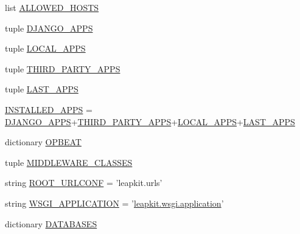 \begin{DoxyCompactItemize}
\item 
list \hyperlink{namespaceleapkit_1_1settings_1_1base__settings_a8035a4c5be4c179f87f9b9f4ac55f0fc}{A\-L\-L\-O\-W\-E\-D\-\_\-\-H\-O\-S\-T\-S}
\item 
tuple \hyperlink{namespaceleapkit_1_1settings_1_1base__settings_a288074ff9c19d256b4ff07e29312cd03}{D\-J\-A\-N\-G\-O\-\_\-\-A\-P\-P\-S}
\item 
tuple \hyperlink{namespaceleapkit_1_1settings_1_1base__settings_a8431da89ba79a3d72efb53593b286738}{L\-O\-C\-A\-L\-\_\-\-A\-P\-P\-S}
\item 
tuple \hyperlink{namespaceleapkit_1_1settings_1_1base__settings_add1b025eed8aa5becfc6a18a0531c7d2}{T\-H\-I\-R\-D\-\_\-\-P\-A\-R\-T\-Y\-\_\-\-A\-P\-P\-S}
\item 
tuple \hyperlink{namespaceleapkit_1_1settings_1_1base__settings_a022062730e649e76b1d2ed9ed44f84a4}{L\-A\-S\-T\-\_\-\-A\-P\-P\-S}
\item 
\hyperlink{namespaceleapkit_1_1settings_1_1base__settings_aed4b9c161ffdcb7cbc206a2aac095609}{I\-N\-S\-T\-A\-L\-L\-E\-D\-\_\-\-A\-P\-P\-S} = \hyperlink{namespaceleapkit_1_1settings_1_1base__settings_a288074ff9c19d256b4ff07e29312cd03}{D\-J\-A\-N\-G\-O\-\_\-\-A\-P\-P\-S}+\hyperlink{namespaceleapkit_1_1settings_1_1base__settings_add1b025eed8aa5becfc6a18a0531c7d2}{T\-H\-I\-R\-D\-\_\-\-P\-A\-R\-T\-Y\-\_\-\-A\-P\-P\-S}+\hyperlink{namespaceleapkit_1_1settings_1_1base__settings_a8431da89ba79a3d72efb53593b286738}{L\-O\-C\-A\-L\-\_\-\-A\-P\-P\-S}+\hyperlink{namespaceleapkit_1_1settings_1_1base__settings_a022062730e649e76b1d2ed9ed44f84a4}{L\-A\-S\-T\-\_\-\-A\-P\-P\-S}
\item 
dictionary \hyperlink{namespaceleapkit_1_1settings_1_1base__settings_a741fb2801950e7f83ca6019995d8f4c7}{O\-P\-B\-E\-A\-T}
\item 
tuple \hyperlink{namespaceleapkit_1_1settings_1_1base__settings_a20a1007ef083dbf3b48e9e18c1771846}{M\-I\-D\-D\-L\-E\-W\-A\-R\-E\-\_\-\-C\-L\-A\-S\-S\-E\-S}
\item 
string \hyperlink{namespaceleapkit_1_1settings_1_1base__settings_a4e52aaa716d30d44e7277e11d58c639e}{R\-O\-O\-T\-\_\-\-U\-R\-L\-C\-O\-N\-F} = 'leapkit.\-urls'
\item 
string \hyperlink{namespaceleapkit_1_1settings_1_1base__settings_a13ff2218b49cb0d5cb596f7cfaef0780}{W\-S\-G\-I\-\_\-\-A\-P\-P\-L\-I\-C\-A\-T\-I\-O\-N} = '\hyperlink{namespaceleapkit_1_1wsgi_ae42478854b5ec7a5151d43ea86f16515}{leapkit.\-wsgi.\-application}'
\item 
dictionary \hyperlink{namespaceleapkit_1_1settings_1_1base__settings_a4e28db2fe65412500c55deba3d3dc524}{D\-A\-T\-A\-B\-A\-S\-E\-S}

\end{DoxyCompactItemize}
